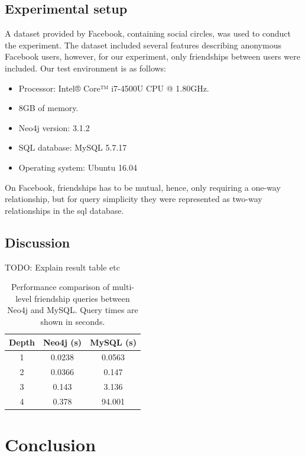\documentclass[a4paper, 12pt, conference]{IEEEtran}
\newcommand{\todo}[1]{}
\renewcommand{\todo}[1]{{\color{blue} TODO:  {#1}}}
\begin{document}
\subsection{Experimental setup}
A dataset provided by Facebook, containing social circles, was used to conduct the experiment.
The dataset included several features describing anonymous Facebook users, however, for our experiment, only friendships between users were included.
Our test environment is as follows: 
\begin{itemize}
	\item Processor: Intel® Core™ i7-4500U CPU @ 1.80GHz.
	\item 8GB of memory. 
	\item Neo4j version: 3.1.2
	\item SQL database: MySQL 5.7.17
	\item Operating system: Ubuntu 16.04
\end{itemize}
On Facebook, friendships has to be mutual, hence, only requiring a one-way relationship, but for query simplicity they were represented as two-way relationships in the sql database.
\subsection{Discussion}
\todo{Explain result table etc}
\begin{table}[t]
	\centering
	\begin{tabular}{c|c|c}
		\textbf{Depth} & \textbf{Neo4j} (s) & \textbf{MySQL} (s) \\ \hline
		1 & 0.0238 & 0.0563 \\ \hline
		2 & 0.0366 & 0.147 \\ \hline
		3 & 0.143 & 3.136 \\ \hline
		4 & 0.378 & 94.001 \\
	\end{tabular}
	\caption{Performance comparison of multi-level friendship queries between Neo4j and MySQL. Query times are shown in seconds.}
\end{table}


\section{Conclusion}



\newpage



\end{document}
